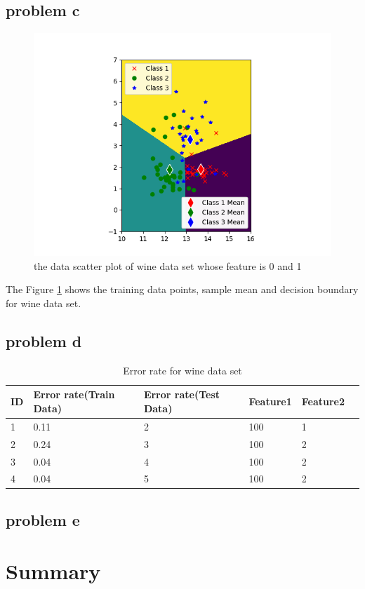 \documentclass{article}
\begin{document}
	\subsection{problem c}
		\begin{figure}[hbt!]
		\includegraphics[width=\linewidth]{images/wine_feature01_train.png}	
		\caption{the data scatter plot of wine data set whose feature is 0 and 1}
		\label{fig:wine_feature01_train}
	\end{figure} 
	The Figure \ref{fig:wine_feature01_train} shows the training data points, sample mean and decision boundary for wine data set. 
	\subsection{problem d}
		\begin{table}[hbt!]
		\begin{center}
			\begin{tabular}{| l | l | l | l | l | p{5cm} |}
				\hline
				ID     & Error rate(Train Data) & Error rate(Test Data) & Feature1 & Feature2   \\ \hline
				1      & 0.11     &    2   & 100      &   1         \\      \hline
				2      & 0.24	  &	    3  & 100      &    2        \\      \hline
				3      & 0.04     &      4 & 100      &     2       \\      \hline
				4      & 0.04	  &	      5& 100      &      2      \\      \hline
			\end{tabular}
		\end{center}
		\caption{Error rate for wine data set}
		\label{table: errorrate}
	\end{table}
	
	\subsection{problem e}
	\section{Summary}
	
\end{document}
